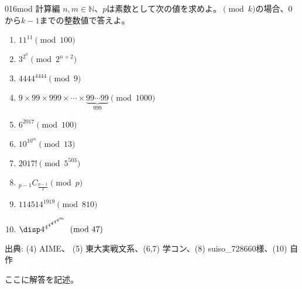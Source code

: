 \begin{thm}{016}{}{mod 計算編}
 $n,m\in\mathbb{N}$、$p$は素数として次の値を求めよ。$\pmod k$の場合、$0$から$k-1$までの整数値で答えよ。
 \begin{enumerate}
  \item $11^{11} \pmod {100}$
  \item $3^{2^n} \pmod {2^{n+2}}$
  \item $4444^{4444} \pmod 9$
  \item $9\times99\times999\times\cdots\times\underbrace{99\cdots99}_{999} \pmod {1000}$
  \item $6^{2017} \pmod {100}$
  \item $10^{10^m} \pmod {13}$
  \item $2017! \pmod 5^{503}$
  \item ${}_{p-1}C_{\frac{p-1}{2}} \pmod p$
  \item $114514^{1919} \pmod {810}$
  \item $\disp 4^{4^{4^{4^{4^{4^m}}}}} \pmod {47}$
 \end{enumerate}
 {\small 出典: (4) AIME、 (5) 東大実戦文系、(6,7) 学コン、(8) suiso\_728660様、(10) 自作}
\end{thm}

ここに解答を記述。